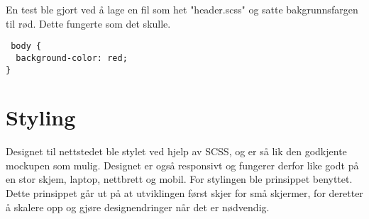 En test ble gjort ved å lage en fil som het "header.scss" og satte bakgrunnsfargen til rød. Dette fungerte som det skulle.

\begin{lstlisting}
 body {
  background-color: red;
}
\end{lstlisting}

\section{Styling}
Designet til nettstedet ble stylet ved hjelp av SCSS, og er så lik den godkjente mockupen som mulig. Designet er også responsivt og fungerer derfor like godt på en stor skjem, laptop, nettbrett og mobil. For stylingen ble prinsippet  benyttet. Dette prinsippet går ut på at utviklingen først skjer for små skjermer, for deretter å skalere opp og gjøre designendringer når det er nødvendig. 











